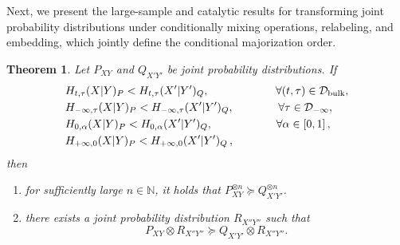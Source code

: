 \documentclass[aps,pra,11pt,onecolumn,nofootinbib,tightenlines]{revtex4-2}
\newtheorem{theorem}{Theorem}[section]
\theoremstyle{definition}
\newcommand{\D}{\mathcal{D}}
\begin{document}
Next, we present the large-sample and catalytic results for transforming joint probability distributions under conditionally mixing operations, relabeling, and embedding, which jointly define the conditional majorization order.

\begin{theorem}
\label{th: large sample and catalytic}
    Let $P_{XY}$ and $Q_{X'Y'}$ be joint probability distributions. If
    \begin{align}
    & H_{t,\tau}(X|Y)_P < H_{t,\tau}(X'|Y')_Q, \qquad\qquad\qquad   \forall (t,\tau) \in \D_{\rm{bulk}},\label{eq:TempCond} \\
    &H_{-\infty,\tau}(X|Y)_P < H_{-\infty,\tau}(X'|Y')_Q, \; \quad\qquad \;\;\, \forall \tau\in \D_{-\infty},\label{eq:TropCond} \\
    &H_{0,\alpha}(X|Y)_P<H_{0,\alpha}(X'|Y')_Q,  \quad\,\quad\qquad\quad\;\; \forall \alpha\in[0,1]\,,\label{eq:DerivCond} \\
    &H_{+\infty,0}(X|Y)_P < H_{+\infty,0}(X'|Y')_Q\,,
    \end{align}
    then
   \begin{enumerate}[itemsep=0pt]
    \item for sufficiently large \(n \in \mathbb{N}\), it holds that $P_{XY}^{\otimes n} \succeq Q_{X'Y'}^{\otimes n}$.
    \item there exists a joint probability distribution \(R_{X''Y''}\) such that
    \begin{equation}
        P_{XY} \otimes R_{X''Y''} \succeq Q_{X'Y'} \otimes R_{X''Y''}.
    \end{equation}
\end{enumerate}
\end{theorem}
\end{document}
